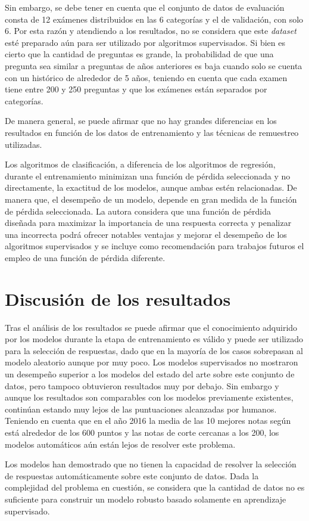 Sin embargo, se debe tener en cuenta que el conjunto de datos de evaluación consta de 12 exámenes distribuidos en las 6 categorías y el de validación, con solo 6. Por esta razón y atendiendo a los resultados, no se considera que este \textit{dataset} esté preparado aún para ser utilizado por algoritmos supervisados. Si bien es cierto que la cantidad de preguntas es grande, la probabilidad de que una pregunta sea similar a preguntas de años anteriores es baja cuando solo se cuenta con un histórico de alrededor de 5 años, teniendo en cuenta que cada examen tiene entre 200 y 250 preguntas y que los exámenes están separados por categorías.

De manera general, se puede afirmar que no hay grandes diferencias en los resultados en función de los datos de entrenamiento y las técnicas de remuestreo utilizadas. 

Los algoritmos de clasificación, a diferencia de los algoritmos de regresión, durante el entrenamiento minimizan una función de pérdida seleccionada y no directamente, la exactitud de los modelos, aunque ambas estén relacionadas. De manera que, el desempeño de un modelo, depende en gran medida de la función de pérdida seleccionada. La autora considera que una función de pérdida diseñada para maximizar la importancia de una respuesta correcta y penalizar una incorrecta podrá ofrecer notables ventajas y mejorar el desempeño de los algoritmos supervisados y se incluye como recomendación para trabajos futuros el empleo de una función de pérdida diferente.

\section{Discusión de los resultados}

Tras el análisis de los resultados se puede afirmar que el conocimiento adquirido por los modelos durante la etapa de entrenamiento es válido y puede ser utilizado para la selección de respuestas, dado que en la mayoría de los casos sobrepasan al modelo aleatorio aunque por muy poco. Los modelos supervisados no mostraron un desempeño superior a los modelos del estado del arte sobre este conjunto de datos, pero tampoco obtuvieron resultados muy por debajo. Sin embargo y aunque los resultados son comparables con los modelos previamente existentes, continúan estando muy lejos de las puntuaciones alcanzadas por humanos. Teniendo en cuenta que en el año 2016 la media de las 10 mejores notas según \cite{2019-head-qa} está alrededor de los 600 puntos y las notas de corte cercanas a los 200, los modelos automáticos aún están lejos de resolver este problema.

Los modelos han demostrado que no tienen la capacidad de resolver la selección de respuestas automáticamente sobre este conjunto de datos. Dada la complejidad del problema en cuestión, se considera que la cantidad de datos no es suficiente para construir un modelo robusto basado solamente en aprendizaje supervisado. 